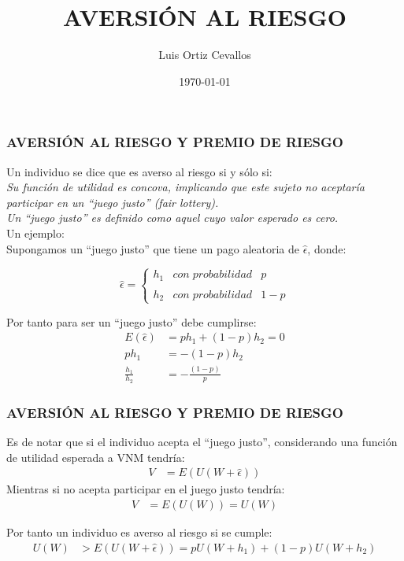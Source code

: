 \documentclass[10pt, xcolor=table, x11names]{beamer}
\title[AVERSIÓN AL RIESGO]{AVERSIÓN AL RIESGO}
\author[Luis Ortiz]{Luis Ortiz Cevallos}
\institute[U]{\bf UNIVERSIDAD}
\date[\today]{\footnotesize \today}
\begin{document}
\begin{frame}
\titlepage
\end{frame}


\begin{frame}
\frametitle{AVERSIÓN AL RIESGO Y PREMIO DE RIESGO}

Un individuo se dice que es averso al riesgo si y sólo si:
\\

\textit{Su función de utilidad es concova, implicando que este sujeto no aceptaría participar en un ``juego justo'' (fair lottery).\\
     Un ``juego justo'' es definido como aquel cuyo valor esperado es cero.}\\

Un ejemplo:\\
Supongamos un ``juego justo'' que tiene un pago aleatoria de $ \hat{\epsilon}$, donde:

\[
\hat{\epsilon}= \left\{ \begin{array}{lcl}
h_{1} & con\; probabilidad & p \\
& & \\
h_{2} & con\; probabilidad & 1-p
\end{array}
\right.
\] 

Por tanto para ser un ``juego justo'' debe cumplirse:
\begin{align}
E(\hat{\epsilon})&=ph_{1}+(1-p)h_{2}=0 \nonumber \\
ph_{1}&=-(1-p)h_{2} \nonumber \\
\frac{h_{1}}{h_{2}}&=-\frac{(1-p)}{p}\nonumber
\end{align}    
\end{frame}


\begin{frame}
    \frametitle{AVERSIÓN AL RIESGO Y PREMIO DE RIESGO}
  Es de notar que si el individuo acepta el ``juego justo'', considerando una función de utilidad esperada a VNM tendría:
\begin{align}
V&=E(U(W+\hat{\epsilon}))\nonumber 
\end{align}    
 Mientras si no acepta participar en el juego justo tendría:
 \begin{align}
 V&=E(U(W))=U(W)\nonumber 
 \end{align}     

Por tanto un individuo es averso al riesgo si se cumple:
\begin{align}
U(W)&> E(U(W+\hat{\epsilon}))=pU(W+h_{1})+(1-p)U(W+h_{2})\nonumber 
\end{align}  
  
\end{frame}
\end{document}
